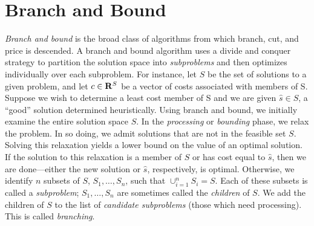 
\section{Branch and Bound}

{\em Branch and bound} is the broad class of algorithms from which
branch, cut, and price is descended. A branch and bound algorithm uses
a divide and conquer strategy to partition the solution space into
{\em subproblems} and then optimizes individually over each
subproblem. For instance, let $S$ be the set of solutions to a given
problem, and let $c \in {\bf R}^S$ be a vector of costs associated
with members of S. Suppose we wish to determine a least cost member of
S and we are given $\hat{s} \in S$, a ``good'' solution determined
heuristically. Using branch and bound, we initially examine the entire
solution space $S$. In the {\em processing} or {\em bounding} phase,
we relax the problem. In so doing, we admit solutions that are not in
the feasible set $S$. Solving this relaxation yields a lower bound on
the value of an optimal solution. If the solution to this relaxation
is a member of $S$ or has cost equal to $\hat{s}$, then we are
done---either the new solution or $\hat{s}$, respectively, is optimal.
Otherwise, we identify $n$ subsets of $S$, $S_1, \ldots, S_n$, such
that $\cup_{i = 1}^n S_i = S$. Each of these subsets is called a {\em
subproblem}; $S_1, \ldots, S_n$ are sometimes called the {\em
children} of $S$. We add the children of $S$ to the list of {\em
candidate subproblems} (those which need processing). This is called
{\em branching}.

